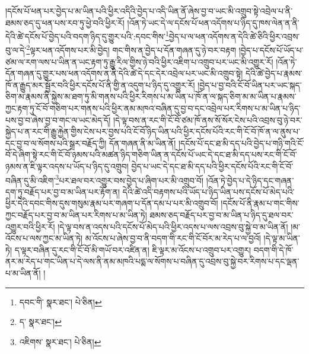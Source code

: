 །དངོས་པོ་ཕན་པར་བྱེད་པ་མ་ཡིན་པའི་ཕྱིར་འདིའི་བྱེད་པ་འདི་ཡིན་ནོ་ཞེས་བྱ་བ་ཡང་མི་འགྲུབ་སྟེ་འབྲེལ་པ་ནི་ཐམས་ཅད་དུ་ཕན་པས་རབ་ཏུ་ཕྱེ་བའི་ཕྱིར་རོ། །འོན་ཏེ་ཡང་དེ་ལ་དངོས་པོ་ཕན་འདོགས་པ་ཉིད་དུ་ཁས་ལེན་ན་ནི་དེའི་ཚེ་དངོས་པོ་བྱེད་པའི་བདག་ཉིད་དུ་གྱུར་པའི་:དབང་གིས་\footnote{དབང་གི་  སྣར་ཐང་།  པེ་ཅིན། }བྱེད་པ་ལ་ཕན་འདོགས་ན་དེའི་ཚེ་ཅིའི་ཕྱིར་འབྲས་བུ་ལ་དེ་\footnote{ད་  སྣར་ཐང་། }ལྟར་ཕན་འདོགས་པར་མི་བྱེད། གང་གིས་ན་བྱེད་པ་དོན་གཞན་དུ་ཉེ་བར་བརྟག །བྱེད་པ་དངོས་པོ་ཡོད་པ་ཙམ་ལ་རག་ལས་པ་ཡིན་ན་ཡང་རྟག་ཏུ་རྒྱུ་རིལ་གྱིས་ཉེ་བའི་ཕྱིར་འཇིག་པ་འགྲུབ་པར་ཡང་མི་འགྱུར་རོ། །འོན་ཏེ་དོན་གཞན་དུ་གྱུར་པས་ཕན་འདོགས་ན་ནི་དེའི་ཚེ་དེ་དང་དེར་འབྲེལ་པར་ཡང་མི་འགྲུབ་སྟེ། དེའི་ཚེ་བྱེད་པ་རྣམས་ཁོ་ན་རྒྱུད་མར་སྦྱོར་བའི་ཕྱིར་དངོས་པོ་ནི་གྱི་ན་འདུག་པ་ཉིད་དུ་འགྱུར་རོ། །བྱེད་པ་བྱ་བའི་ངོ་བོ་ཡིན་པར་ཡང་སྐད་ཅིག་མ་རྣམས་ནི་སྐྱེས་མ་ཐག་ཏུ་མི་གནས་པའི་ཕྱིར་རིགས་པ་མ་ཡིན་པ་ཁོ་ན་ལ་སྐད་ཅིག་མ་མ་ཡིན་པ་རྣམས་ཀྱང་རྟག་ཏུ་ངོ་བོ་གཅིག་པར་གནས་པའི་ཕྱིར་ནམ་མཁའ་བཞིན་དུ་བྱ་བ་དང་འབྲེལ་པར་རིགས་པ་མ་ཡིན་པ་ཉིད་པས་བྱ་བ་ཞེས་བྱ་བ་གང་ལ་ཡང་མེད་དོ། །དེ་ལྟ་བས་ན་རང་གི་ངོ་བོ་ཙམ་ཁོ་ནས་སོ་སོར་ངེས་པའི་འབྲས་བུ་ཉེ་བར་སྐྱེད་པ་ན་རང་གི་རྒྱུ་རྐྱེན་གྱིས་ངེས་པར་བྱས་པའི་ངོ་བོ་ཉིད་ཡིན་པའི་ཕྱིར་དངོས་པོའི་རང་གི་ངོ་བོ་ཁོ་ན་ལ་ནུས་པ་དང་བྱ་བ་ལ་སོགས་པའི་སྒྲར་བརྗོད་ཀྱི། དོན་གཞན་ནི་མ་ཡིན་ནོ། །དངོས་པོ་དང་ཐ་མི་དད་པའི་བྱེད་པ་གཉི་གའི་ངོ་བོ་དེ་ཞིག་སྟེ་རང་གི་ངོ་བོ་ཉམས་པའི་མཚན་ཉིད་གཅིག་ཡིན་ན་དངོས་པོ་ཡང་དེ་དང་ཐ་མི་དད་པས་རང་གི་ངོ་བོ་ཉམས་ན་ཇི་ལྟར་འདས་པ་ཡོད་པ་ཉིད་དུ་འགྲུབ། བྱེད་པ་ཡང་དེ་དང་ཐ་མི་དད་པའི་ཕྱིར་དངོས་པོའི་རང་གི་ངོ་བོ་བཞིན་དུ་མི་འཇིག་\footnote{འཇིགས་  སྣར་ཐང་།  པེ་ཅིན། }པར་ཐལ་བར་འགྱུར་བས་བྱེད་པ་ཞིག་པར་མི་འགྲུབ་བོ། །འོན་ཏེ་བྱེད་པ་དེ་ཉིད་དང་གཞན་དག་ཏུ་བརྗོད་པར་བྱ་བ་མ་ཡིན་པར་རྟོག་ན། དེའི་ཚེ་འདི་བརྟགས་པའི་ཡོད་པ་ཉིད་ཡིན་པས་དངོས་པོ་མེད་པའི་ཕྱིར་དེའི་དབང་གིས་དུས་གསུམ་རྣམ་པར་གཞག་པ་དོན་དམ་པ་པར་མི་འགྲུབ་བོ། །དངོས་པོ་ནི་རྣམ་པ་གང་གིས་ཀྱང་བརྗོད་པར་བྱ་བ་མ་ཡིན་པར་རིགས་པ་མ་ཡིན་ཏེ། ཐམས་ཅད་བརྗོད་པར་བྱ་བ་མ་ཡིན་པ་ཉིད་དུ་ཐལ་བར་འགྱུར་བའི་ཕྱིར་རོ། །དེ་ལྟ་བས་ན་འདས་པའི་དངོས་པོ་མེད་པའི་ཕྱིར་འདས་པ་ལས་འབྲས་བུ་སྐྱེ་བ་མ་ཡིན་ནོ། །མ་འོངས་པ་ལས་ཀྱང་མ་ཡིན་ཏེ། མ་འོངས་པ་ཞེས་བྱ་བ་ནི་བདག་གི་རང་གི་ངོ་བོར་མ་རེད་པ་ལ་བྱའོ། །དེ་ལྟ་མ་ཡིན་ཏེ། ད་ལྟར་བཞིན་དུ་རང་གི་ངོ་བོ་མི་གཡོ་བར་འཛིན་ན། ཇི་ལྟར་མ་འོངས་པ་འགྲུབ་པར་འགྱུར། བདག་གི་དེ་ཁོ་ནར་མ་རེད་པ་གང་ཡིན་པ་དེ་ལས་ནི་ནམ་མཁའི་པདྨ་ལ་སོགས་པ་བཞིན་དུ་འབྲས་བུ་སྐྱེ་བར་རིགས་པ་དང་ལྡན་པ་མ་ཡིན་ནོ། །

